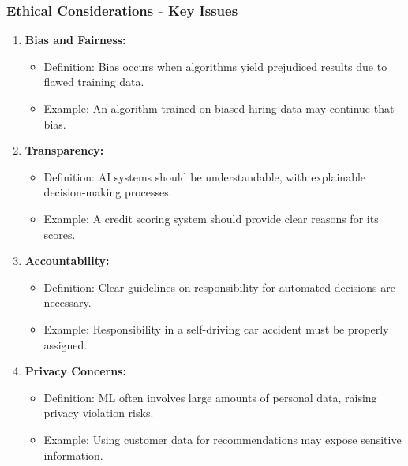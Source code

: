 \documentclass[aspectratio=169]{beamer}
\begin{document}
\begin{frame}[fragile]
    \frametitle{Ethical Considerations - Key Issues}
    \begin{enumerate}
        \item \textbf{Bias and Fairness:} 
            \begin{itemize}
                \item Definition: Bias occurs when algorithms yield prejudiced results due to flawed training data.
                \item Example: An algorithm trained on biased hiring data may continue that bias.
            \end{itemize}
        \item \textbf{Transparency:}
            \begin{itemize}
                \item Definition: AI systems should be understandable, with explainable decision-making processes.
                \item Example: A credit scoring system should provide clear reasons for its scores.
            \end{itemize}
        \item \textbf{Accountability:} 
            \begin{itemize}
                \item Definition: Clear guidelines on responsibility for automated decisions are necessary.
                \item Example: Responsibility in a self-driving car accident must be properly assigned.
            \end{itemize}
        \item \textbf{Privacy Concerns:}
            \begin{itemize}
                \item Definition: ML often involves large amounts of personal data, raising privacy violation risks.
                \item Example: Using customer data for recommendations may expose sensitive information.
            \end{itemize}
    \end{enumerate}
\end{frame}
\end{document}
